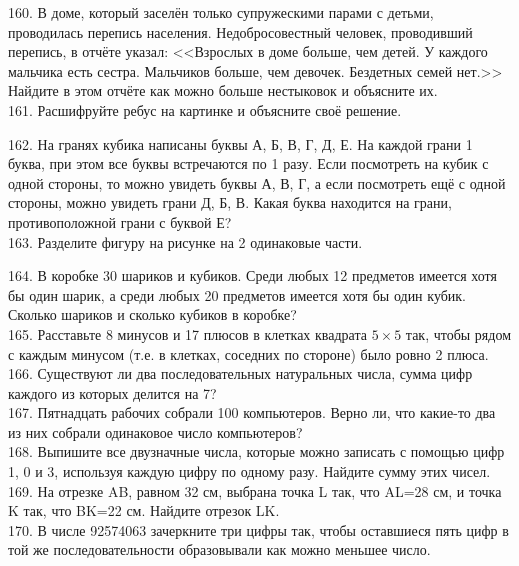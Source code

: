 160. В доме, который заселён только супружескими парами с детьми, проводилась перепись населения. Недобросовестный человек, проводивший перепись, в отчёте указал: <<Взрослых в доме больше, чем детей. У каждого мальчика есть сестра. Мальчиков больше, чем девочек. Бездетных семей нет.>> Найдите в этом отчёте
как можно больше нестыковок и объясните их.\\
161. Расшифруйте ребус на картинке и объясните своё решение.
\begin{center}
\begin{figure}[ht!]
\end{figure}
\end{center}
162. На гранях кубика написаны буквы А, Б, В, Г, Д, Е. На каждой грани 1 буква, при этом все буквы встречаются по 1 разу. Если посмотреть на кубик с одной стороны, то можно увидеть буквы А, В, Г, а если посмотреть ещё с одной стороны, можно увидеть грани Д, Б, В. Какая буква находится на грани, противоположной грани с буквой Е?\\
163. Разделите фигуру на рисунке на 2 одинаковые части.
\begin{center}
\begin{figure}[ht!]
\end{figure}
\end{center}
164. В коробке 30 шариков и кубиков. Среди любых 12 предметов имеется хотя бы один шарик, а среди любых 20 предметов имеется хотя бы один кубик. Сколько шариков и сколько кубиков в коробке?\\
165. Расставьте 8 минусов и 17 плюсов в клетках квадрата $5\times5$ так, чтобы рядом с каждым минусом (т.е. в клетках, соседних по стороне) было ровно 2 плюса.\\
166. Существуют ли два последовательных натуральных числа, сумма цифр каждого из которых делится на 7?\\
167. Пятнадцать рабочих собрали 100 компьютеров. Верно ли, что какие-то два из них собрали одинаковое число компьютеров?\\
168. Выпишите все двузначные числа, которые можно записать с помощью цифр 1, 0 и 3, используя каждую цифру по одному разу. Найдите сумму этих чисел.\\
169. На отрезке AB, равном 32 см, выбрана точка L так, что AL=28 см, и точка K так, что BK=22 см. Найдите отрезок LK.\\
170. В числе 92574063 зачеркните три цифры так, чтобы оставшиеся пять цифр в той же последовательности образовывали как можно меньшее число.\\
